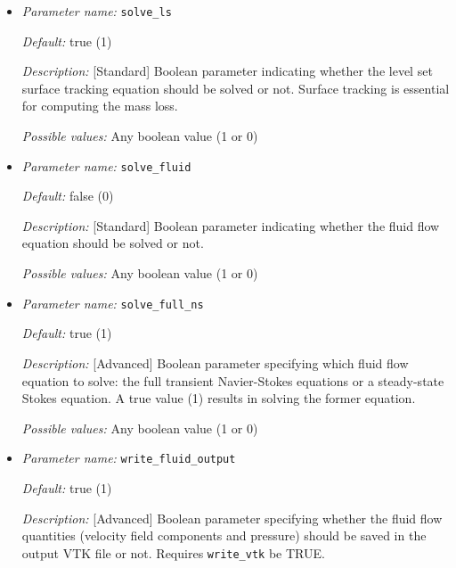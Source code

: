 \begin{itemize}
\item {\it Parameter name:} {\tt solve\_ls}
\label{parameters:solve_ls}


{\it Default:} true (1)

{\it Description:} [Standard] Boolean parameter indicating whether the level set surface tracking equation should be solved or not. Surface tracking is essential for computing the mass loss.

{\it Possible values:} Any boolean value (1 or 0)


\item {\it Parameter name:} {\tt solve\_fluid}
\label{parameters:solve_fluid}


{\it Default:} false (0)

{\it Description:} [Standard] Boolean parameter indicating whether the fluid flow equation should be solved or not.

{\it Possible values:} Any boolean value (1 or 0)


\item {\it Parameter name:} {\tt solve\_full\_ns}
\label{parameters:solve_full_ns}


{\it Default:} true (1)

{\it Description:} [Advanced] Boolean parameter specifying which fluid flow equation to solve: the full transient Navier-Stokes equations or a steady-state Stokes equation. A true value (1) results in \biodeg{} solving the former equation.

{\it Possible values:} Any boolean value (1 or 0)


\item {\it Parameter name:} {\tt write\_fluid\_output}
\label{parameters:write_fluid_output}


{\it Default:} true (1)

{\it Description:} [Advanced] Boolean parameter specifying whether the fluid flow quantities (velocity field components and pressure) should be saved in the output VTK file or not. Requires {\tt write\_vtk} be TRUE.


\end{itemize}
